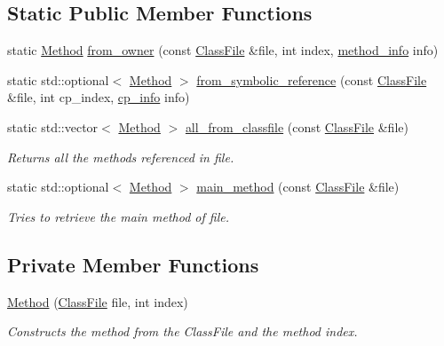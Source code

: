 \subsection*{Static Public Member Functions}
\begin{DoxyCompactItemize}
\item 
static \hyperlink{classMethod}{Method} \hyperlink{classMethod_ad977afdb14569e1108c6b6849fe0b007}{from\+\_\+owner} (const \hyperlink{classfile_8h_a00b46b60bc40e813e9fb1bb049174346}{Class\+File} \&file, int index, \hyperlink{structmethod__info}{method\+\_\+info} info)
\item 
static std\+::optional$<$ \hyperlink{classMethod}{Method} $>$ \hyperlink{classMethod_adddc54ce699dfb1ba305595507085a29}{from\+\_\+symbolic\+\_\+reference} (const \hyperlink{classfile_8h_a00b46b60bc40e813e9fb1bb049174346}{Class\+File} \&file, int cp\+\_\+index, \hyperlink{structcp__info}{cp\+\_\+info} info)
\item 
static std\+::vector$<$ \hyperlink{classMethod}{Method} $>$ \hyperlink{classMethod_a7b631e75e7438bb79c285b1bc6a712ab}{all\+\_\+from\+\_\+classfile} (const \hyperlink{classfile_8h_a00b46b60bc40e813e9fb1bb049174346}{Class\+File} \&file)
\begin{DoxyCompactList}\small\item\em Returns all the methods referenced in {\ttfamily file}. \end{DoxyCompactList}\item 
static std\+::optional$<$ \hyperlink{classMethod}{Method} $>$ \hyperlink{classMethod_a74801df628f1be6e2c616cf5feb328b1}{main\+\_\+method} (const \hyperlink{classfile_8h_a00b46b60bc40e813e9fb1bb049174346}{Class\+File} \&file)
\begin{DoxyCompactList}\small\item\em Tries to retrieve the main method of {\ttfamily file}. \end{DoxyCompactList}\end{DoxyCompactItemize}
\subsection*{Private Member Functions}
\begin{DoxyCompactItemize}
\item 
\hyperlink{classMethod_aba8db898e71ab542920887eba94e6234}{Method} (\hyperlink{classfile_8h_a00b46b60bc40e813e9fb1bb049174346}{Class\+File} file, int index)
\begin{DoxyCompactList}\small\item\em Constructs the method from the Class\+File and the method index. \end{DoxyCompactList}\end{DoxyCompactItemize}
